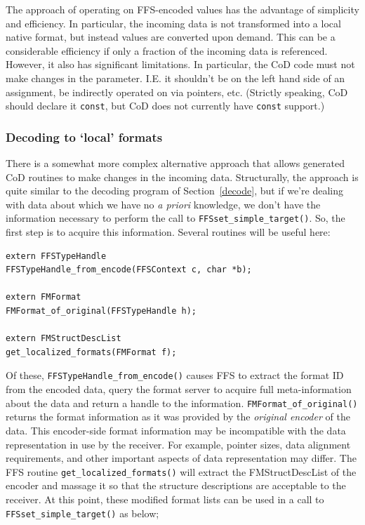 {The approach of operating on FFS-encoded values has the advantage of
simplicity and efficiency.  In particular, the incoming data is not
transformed into a local native format, but instead values are converted
upon demand.  This can be a considerable efficiency if only a fraction of
the incoming data is referenced.  However, it also has significant
limitations.  In particular, the CoD code must not make changes in the
parameter.  I.E. it shouldn't be on the left hand side of an assignment, be
indirectly operated on via pointers, etc.  (Strictly speaking, CoD should
declare it {\tt const}, but CoD does not currently have {\tt const} support.)

\subsubsection{Decoding to `local' formats}

There is a somewhat more complex alternative approach that allows generated
CoD routines to make changes in the incoming data.  Structurally, the
approach is quite similar to the decoding program of Section~\ref{decode},
but if we're dealing with data about which we have no {\it a priori}
knowledge, we don't have the information necessary to perform the call to
{\tt FFSset\_simple\_target()}.  So, the first step is to acquire this
information.  Several routines will be useful here:
\begin{verbatim}
extern FFSTypeHandle 
FFSTypeHandle_from_encode(FFSContext c, char *b);

extern FMFormat 
FMFormat_of_original(FFSTypeHandle h);

extern FMStructDescList
get_localized_formats(FMFormat f);
\end{verbatim}

Of these, {\tt FFSTypeHandle\_from\_encode()} causes FFS to extract the
format ID from the encoded data, query the format server to acquire full
meta-information about the data and return a handle to the information.
{\tt FMFormat\_of\_original()} returns the format information as it was
provided by the {\it original encoder} of the data.  This encoder-side
format information may be incompatible with the data representation in use
by the receiver.  For example, pointer sizes, data alignment requirements,
and other important aspects of data representation may differ.  The FFS
routine {\tt get\_localized\_formats()} will extract the FMStructDescList of
the encoder and massage it so that the structure descriptions are acceptable
to the receiver.  At this point, these modified format lists can be used in
a call to {\tt FFSset\_simple\_target()} as below;

}
